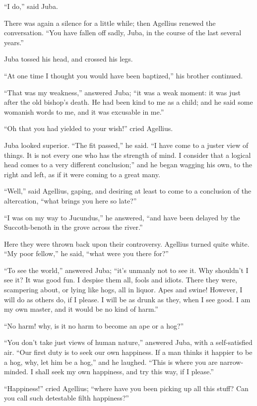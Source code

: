 ``I do,'' said Juba.

There was again a silence for a little while; then Agellius renewed
the conversation. ``You have fallen off sadly, Juba, in the course
of the last several years.''

Juba tossed his head, and crossed his legs.

``At one time I thought you would have been baptized,'' his
brother continued.

``That was my weakness,'' answered Juba; ``it was a weak moment: it was just after the old bishop's death. He had been
kind to me as a child; and he said some womanish words to me, and it
was excusable in me.''

``Oh that you had yielded to your wish!'' cried Agellius.

Juba looked superior. ``The fit passed,'' he said. ``I
have come to a juster view of things. It is not every one who has the
strength of mind. I consider that a logical head comes to a very
different conclusion;'' and he began wagging his own, to the right
and left, as if it were coming to a great many.

``Well,'' said Agellius, gaping, and desiring at least to
come to a conclusion of the altercation, ``what brings you here so
late?''

``I was on my way to Jucundus,'' he answered, ``and
have been delayed by the Succoth-benoth in the grove across the
river.''

Here they were thrown back upon their controversy. Agellius turned
quite white. ``My poor fellow,'' he said, ``what were you
there for?''

``To see the world,'' answered Juba; ``it's unmanly not
to see it. Why shouldn't I see it? It was good fun. I despise them
all, fools and idiots. There they were, scampering about, or lying
like hogs, all in liquor. Apes and swine! However, I will do as others
do, if I please. I will be as drunk as they, when I see good. I am my
own master, and it would be no kind of harm.''

``No harm! why, is it no harm to become an ape or a hog?''

``You don't take just views of human nature,'' answered
Juba, with a self-satisfied air. ``Our first duty is to seek our
own happiness. If a man thinks it happier to be a hog, why, let him be
a hog,'' and he laughed. ``This is where you are
narrow-minded. I shall seek my own happiness, and try this way, if I
please.''

``Happiness!'' cried Agellius; ``where have you been
picking up all this stuff? Can you call such detestable filth
happiness?''

